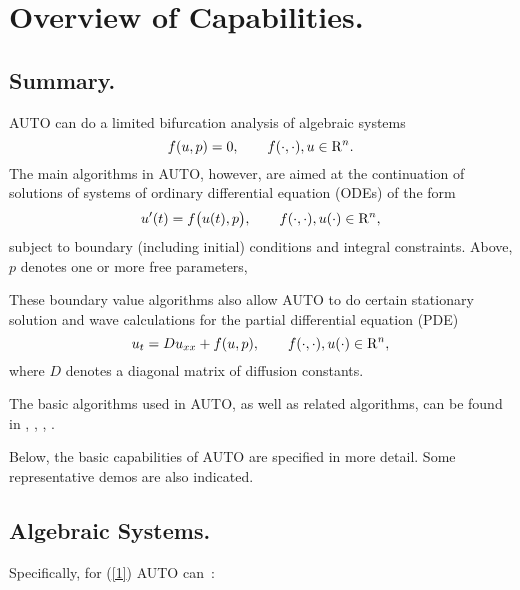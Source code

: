 \documentclass[12pt]{report}
\def\Rn{{\rm R}^n}
\begin{document}
\chapter{ Overview of Capabilities.} \label{ch:Overview}
\section{ Summary.} \label{sec:Summary}
{\cal AUTO} can do a limited bifurcation analysis of algebraic systems
\begin{equation} \label{1} 
  f( u , p ) = 0 ,  \qquad  f(\cdot,\cdot) , u \in \Rn.
\end{equation}
The main algorithms in {\cal AUTO}, however, are aimed at the continuation
of solutions of systems of ordinary differential equation (ODEs) of the form
\begin{equation} \label{2} 
 u'(t) = f\bigl( u(t) , p \bigr) , 
  \qquad  f(\cdot,\cdot) , u(\cdot) \in \Rn,
\end{equation}
subject to boundary (including initial) conditions and integral constraints.
Above, $p$ denotes one or more free parameters,

These boundary value algorithms also allow {\cal AUTO} to do certain stationary 
solution and wave calculations for the partial differential equation (PDE)
\begin{equation} \label{3} 
  u_t = D u_{xx} + f( u , p ), 
  \qquad  f(\cdot,\cdot) , u(\cdot) \in \Rn,
\end{equation}
where $D$ denotes a diagonal matrix of diffusion constants.

The basic algorithms used in {\cal AUTO},
as well as related algorithms, can be found in 
 \citeyear{HBK:77},
 \citeyear{HBK:86},
 \citeyear{DoKeKe:91a},
 \citeyear{DoKeKe:91b}.

Below, the basic capabilities of {\cal AUTO} are specified in more detail.
Some representative demos are also indicated.
 
\section{ Algebraic Systems.} \label{sec:algebraic_systems}
Specifically, for (\ref{1}) {\cal AUTO} can~:~
 
\end{document}
